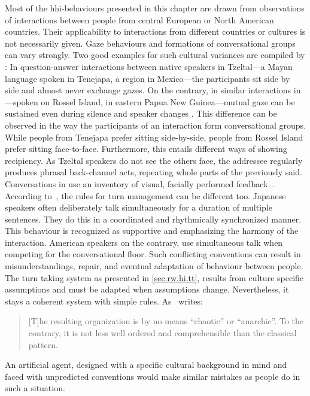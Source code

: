 Most of the \gls{hhi}-behaviours presented in this chapter are drawn from observations of interactions between people from central European or North American countries.
Their applicability to interactions from different countries or cultures is not necessarily given.
Gaze behaviours and formations of \glspl{conversational group} can vary strongly.
Two good examples for such cultural variances are compiled by :
In question-answer interactions between native \glspl{speaker} in Tzeltal---a Mayan language spoken in Tenejapa, a region in Mexico---the participants sit side by side and almost never exchange gazes.
On the contrary, in similar interactions in \yele{}---spoken on Rossel Island, in eastern Papua New Guinea---mutual gaze can be sustained even during silence and \gls{speaker} changes \cite{Rossano2009}.
This difference can be observed in the way the participants of an interaction form \glspl{conversational group}.
While people from Tenejapa prefer sitting side-by-side, people from Rossel Island prefer sitting face-to-face.
Furthermore, this entails different ways of showing recipiency.
As Tzeltal \glspl{speaker} do not see the others face, the \gls{addressee} regularly produces phrasal back-channel acts, repeating whole parts of the previously said.
Conversations in \yele{} use an inventory of visual, facially performed feedback~\cite[]{Rossano2009}.
According to~, the rules for \gls{turn} management can be different too.
Japanese \glspl{speaker} often deliberately talk simultaneously for a duration of multiple sentences.
They do this in a coordinated and rhythmically synchronized manner.
This behaviour is recognized as supportive and emphasizing the harmony of the interaction.
American \glspl{speaker} on the contrary, use simultaneous talk when competing for the \gls{conversational floor}.
Such conflicting conventions can result in misunderstandings, repair, and eventual adaptation of behaviour between people.
The \gls{turn taking} system as presented in \vref{sec.rw.hi.tt}, results from culture specific assumptions and must be adapted when assumptions change.
Nevertheless, it stays a coherent system with simple rules.
As~\citeauthor*{Meyer2018} writes: \blockcquote[p. 304]{Meyer2018}{[T]he resulting  organization is by no means \enquote{cha\-o\-tic} or \enquote{anarchic}. To the contrary, it is not less well ordered and comprehensible than the classical pattern.}.
An \gls{artificial agent}, designed with a specific cultural background in mind and faced with unpredicted conventions would make similar mistakes as people do in such a situation.
